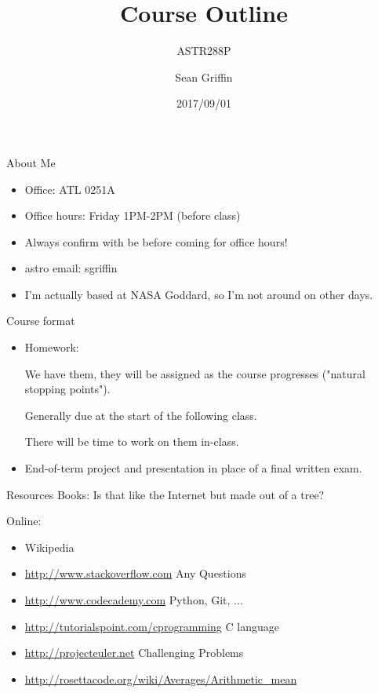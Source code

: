 \documentclass[10pt]{beamer}
\title{Course Outline}
\subtitle{ASTR288P}
\date{2017/09/01}
\author{Sean Griffin}
\institute{UMCP / NASA GSFC}
\begin{document}
\maketitle


\begin{frame}[fragile]{About Me}
	\begin{itemize}
		\item Office: ATL 0251A
		\item Office hours: Friday 1PM-2PM (before class)
                \item Always confirm with be before coming for office hours!
                \item astro email: sgriffin 
		\item I'm actually based at NASA Goddard, so I'm not around on other days.
	\end{itemize}
\end{frame}

\begin{frame}[fragile]{Course format}
	\begin{itemize}
		\item Homework: 
		
		We have them, they will be assigned as the course progresses ("natural stopping points").
			
		Generally due at the start of the following class.

                There will be time to work on them in-class.
                
		\item End-of-term project and presentation in place of a final written exam.
	\end{itemize}
\end{frame}

\begin{frame}[fragile]{Resources}
	Books: Is that like the Internet but made out of a tree? 
	
	Online: 
	\begin{itemize}
		\item Wikipedia
		\item \url{http://www.stackoverflow.com} Any Questions
		\item \url{http://www.codecademy.com} Python, Git, ...
		\item \url{http://tutorialspoint.com/cprogramming} C language
		\item \url{http://projecteuler.net} Challenging Problems
   		\item \url{http://rosettacode.org/wiki/Averages/Arithmetic_mean}
	\end{itemize}

\end{frame}
\end{document}
